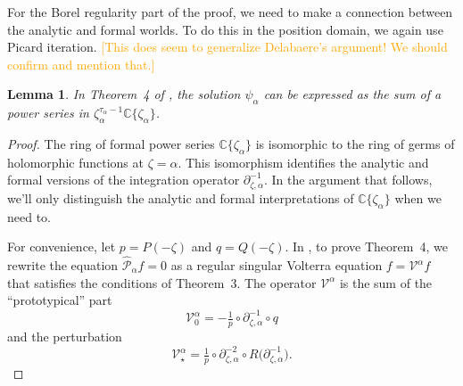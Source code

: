 \documentclass{article}
\newcommand{\C}{\mathbb{C}}
\newcommand{\volterra}{\mathcal{V}}
\newcommand{\hardpart}{\mathcal{V}_0}
\newcommand{\softpart}{\mathcal{V}_\star}
\newcommand{\solwhole}{f}
\theoremstyle{definition}
\theoremstyle{plain}
\newtheorem{lemma}[definition]{Lemma}
\begin{document}
For the Borel regularity part of the proof, we need to make a connection between the analytic and formal worlds. To do this in the position domain, we again use Picard iteration. \textcolor{orange}{[This does seem to generalize Delabaere's argument! We should confirm and mention that.]}
\begin{lemma}\label{lem:picard-power}
In Theorem~4 of \cite{reg-sing-volterra}, the solution $\psi_\alpha$ can be expressed as the sum of a power series in $\zeta_\alpha^{\tau_\alpha - 1} \C\{\zeta_\alpha\}$.
\end{lemma}
\begin{proof}
The ring of formal power series $\C\{\zeta_\alpha\}$ is isomorphic to the ring of germs of holomorphic functions at $\zeta = \alpha$. This isomorphism identifies the analytic and formal versions of the integration operator $\partial^{-1}_{\zeta, \alpha}$. In the argument that follows, we'll only distinguish the analytic and formal interpretations of $\C\{\zeta_\alpha\}$ when we need to.

For convenience, let $p = P(-\zeta)$ and $q = Q(-\zeta)$. In \cite{reg-sing-volterra}, to prove Theorem~4, we rewrite the equation $\hat{\mathcal{P}}_\alpha \solwhole = 0$ as a regular singular Volterra equation $\solwhole = \volterra^\alpha \solwhole$ that satisfies the conditions of Theorem~3. The operator $\volterra^\alpha$ is the sum of the ``prototypical'' part
\[ \hardpart^\alpha = -\tfrac{1}{p} \circ \partial^{-1}_{\zeta, \alpha} \circ q \]
and the perturbation
\[ \softpart^\alpha = \tfrac{1}{p} \circ \partial^{-2}_{\zeta, \alpha} \circ R\big(\partial^{-1}_{\zeta, \alpha}\big). \]


\end{proof}
\end{document}

